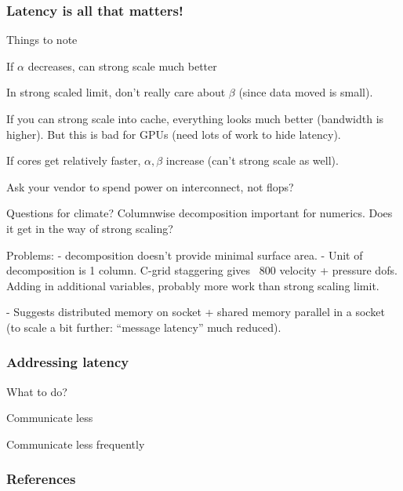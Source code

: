 \documentclass[presentation]{beamer}
\begin{document}
\begin{frame}
  \frametitle{Latency is all that matters!}

  Things to note

  If $\alpha$ decreases, can strong scale much better

  In strong scaled limit, don't really care about $\beta$ (since data
  moved is small).

  If you can strong scale into cache, everything looks much better
  (bandwidth is higher).  But this is bad for GPUs (need lots of work
  to hide latency).

  If cores get relatively faster, $\alpha, \beta$ increase (can't
  strong scale as well).

  Ask your vendor to spend power on interconnect, not flops?

  Questions for climate?  Columnwise decomposition important for
  numerics.  Does it get in the way of strong scaling? 
  
  Problems:
  - decomposition doesn't provide minimal surface area.
  - Unit of decomposition is 1 column.  C-grid staggering gives ~800
  velocity + pressure dofs.  Adding in additional variables, probably
  more work than strong scaling limit.

  - Suggests distributed memory on socket + shared memory parallel in
  a socket (to scale a bit further: ``message latency'' much reduced).
\end{frame}

\begin{frame}
  \frametitle{Addressing latency}
  What to do?

  Communicate less

  Communicate less frequently
\end{frame}
\appendix
\begin{frame}[t,allowframebreaks]
  \frametitle{References}
  
  \printbibliography[heading=none]
\end{frame}
\end{document}
